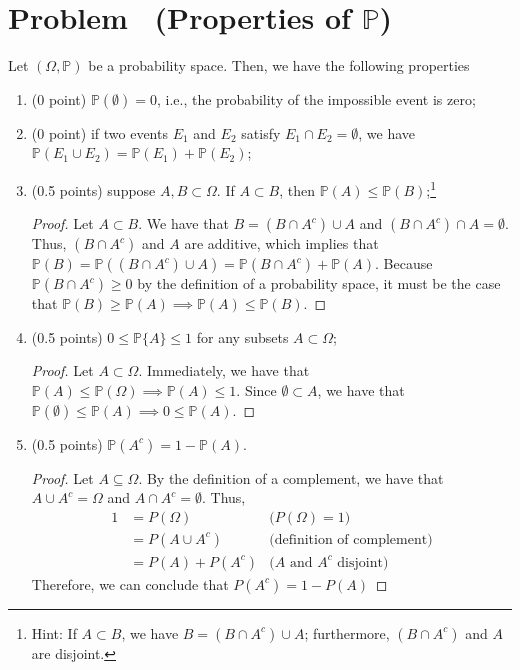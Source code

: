 \documentclass[11pt]{article}
\newcounter{pppp}
\newcommand{\prob}{\arabic{pppp}} %
\newcommand{\increase}{\addtocounter{pppp}{1}} %
\newcommand{\newproblem}[2]{
    \increase
    \section*{Problem \prob~(#1) \hfill {#2}}
}
\newcommand{\p}{\mathbb{P}}
\begin{document}
\newproblem{Properties of $\mathbb{P}$}{ }

Let $(\Omega, \mathbb{P})$ be a probability space. Then, we have the following properties
\begin{enumerate}
\item (0 point) $\mathbb{P}(\emptyset)=0$, i.e., the probability of the impossible event is zero; 
\item (0 point) if two events $E_1$ and $E_2$ satisfy $E_1\cap E_2=\emptyset$, we have $\mathbb{P}(E_1\cup E_2)=\mathbb{P}(E_1)+ \mathbb{P}(E_2)$;
\item (0.5 points) suppose $A,B\subset\Omega$. If $A\subset B$, then $\mathbb{P}(A)\le \mathbb{P}(B)$;\footnote{Hint: If $A\subset B$, we have $B=(B\cap A^c)\cup A$; furthermore, $(B\cap A^c)$ and $A$ are disjoint.}

\begin{proof}
  Let \(A\subset B\). We have that \(B=(B\cap A^c)\cup A\) and \((B\cap A^c)\cap A=\emptyset\).
  Thus, \((B\cap A^c)\) and \(A\) are additive, which implies that \(\p(B)=\p((B\cap A^c)\cup A) = \p(B\cap A^c) + \p(A)\).
  Because \(\p(B\cap A^c)\geq 0\) by the definition of a probability space, it must be the case that
  \(\p(B)\geq \p(A)\implies \p(A)\leq\p(B)\).
\end{proof}

\item (0.5 points) $0\le \mathbb{P}\{A\} \le 1$ for any subsets $A \subset \Omega$; 

\begin{proof}
  Let \(A\subset\Omega\). Immediately, we have that \(\p(A)\leq\p(\Omega)\implies\p(A)\leq 1\). Since \(\emptyset\subset A\), we have that \(\p(\emptyset)\leq\p(A)\implies0\leq\p(A)\).
\end{proof}

\item (0.5 points) $\mathbb{P}(A^c)=1-\mathbb{P}(A)$.
 
\begin{proof}
  Let \(A\subseteq \Omega\). By the definition of a complement, we have that \(A\cup A^c=\Omega\)
  and \(A\cap A^c=\emptyset\). Thus,
  \begin{align*}
     1 &= P(\Omega) & \text{(\(P(\Omega)=1\))}\\
     &= P(A\cup A^c) & \text{(definition of complement)}\\
     &=P(A)+P(A^c) & \text{(\(A\) and \(A^c\) disjoint)}
  \end{align*}
  Therefore, we can conclude that \(P(A^c)=1-P(A)\)
\end{proof}


\end{enumerate}
\end{document}
